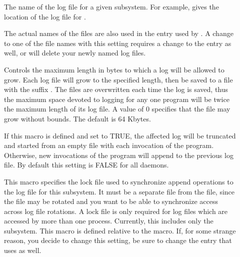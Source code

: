 \begin{description}
 
\item[] \label{param:SubsysLog} The name of
  the log file for a given subsystem.  For example,
   gives the location of the log file for
  .

  The actual names of the files
  are also used in the  entry used by
  .  A change to one of the
  file names with this setting requires a change to the
   entry as well, or  will
  delete your newly named log files.

\item[] \label{param:MaxSubsysLog} Controls
  the maximum length in bytes to which a
  log will be allowed to grow.  Each log file will grow to the
  specified length, then be saved to a file with the suffix
  .  The 
  files are overwritten each time the log is saved, thus the maximum
  space devoted to logging for any one program will be twice the
  maximum length of its log file.  A value of 0 specifies that the
  file may grow without bounds.  The default is 64 Kbytes.

\item[]
  \label{param:TruncSubsysLogOnOpen}  If this macro is defined and set
  to TRUE, the affected log will be truncated and started from an
  empty file with each invocation of the program.  Otherwise, new
  invocations of the program will append to the previous log
  file.  By default this setting is FALSE for all daemons. 

\item[] \label{param:SubsysLock} This macro
  specifies the lock file used to synchronize append operations to the
  log file for this subsystem.  It must be a separate file from the
   file, since the  file may be
  rotated and you want to be able to synchronize access across log
  file rotations.  A lock file is only required for log files which
  are accessed by more than one process.  Currently, this includes
  only the  subsystem.  This macro is defined relative
  to the  macro.  If, for some strange
  reason, you decide to change this setting, be sure to change the
   entry that  uses as well.


\end{description}
